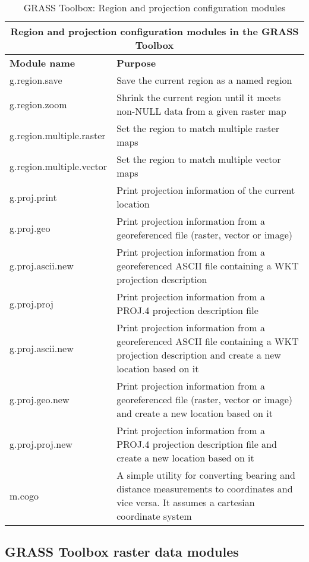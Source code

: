 \begin{table}[ht]
\centering
\caption{GRASS Toolbox: Region and projection configuration modules}\medskip
 \begin{tabular}{|p{4cm}|p{12cm}|}
  \hline \multicolumn{2}{|c|}{\textbf{Region and projection configuration
  modules in the GRASS Toolbox}} \\
  \hline \textbf{Module name} & \textbf{Purpose} \\
  \hline g.region.save & Save the current region as a named region \\
  \hline g.region.zoom & Shrink the current region until it meets non-NULL
   data from a given raster map \\
  \hline g.region.multiple.raster & Set the region to match multiple raster
  maps \\
  \hline g.region.multiple.vector & Set the region to match multiple vector
  maps \\
  \hline g.proj.print & Print projection information of the current location\\
  \hline g.proj.geo & Print projection information from a georeferenced file
  (raster, vector or image)\\
  \hline g.proj.ascii.new & Print projection information from a
  georeferenced ASCII file containing a WKT projection description\\
  \hline g.proj.proj & Print projection information from a PROJ.4 projection
  description file\\
  \hline g.proj.ascii.new & Print projection information from a georeferenced
  ASCII file containing a WKT projection description and create a new
  location based on it\\
  \hline g.proj.geo.new & Print projection information from a georeferenced
  file (raster, vector or image) and create a new location based on it\\
  \hline g.proj.proj.new & Print projection information from a PROJ.4
  projection description file and create a new location based on it \\
  \hline m.cogo & A simple utility for converting bearing and distance
  measurements to coordinates and vice versa. It assumes a cartesian
  coordinate system \\
\hline
\end{tabular}
\end{table}

\clearpage

\subsection{GRASS Toolbox raster data modules}

